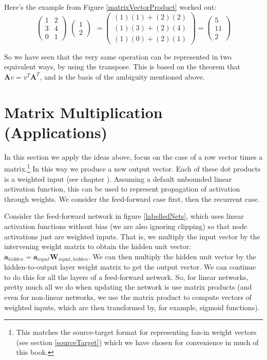 Here's the example from Figure \ref{matrixVectorProduct} worked out:
\[
  \begin{pmatrix}
    1 & 2 \\
    3 & 4 \\
    0 & 1
  \end{pmatrix}
    \begin{matrix}
    \begin{pmatrix}1\\2\end{pmatrix}
  \end{matrix}
  =
  \begin{pmatrix}
    (1)(1) + (2)(2) \\
    (1)(3) + (2)(4) \\
    (1)(0) + (2)(1)
  \end{pmatrix}
  =
  \begin{pmatrix}
    5 \\
    11 \\
    2
  \end{pmatrix}
\]
\vspace*{.1cm}


So we have seen that the very same operation can be represented in two equivalent ways, by using the transpose. This is based on the theorem that  $\mathbf{A}v =  v^T\mathbf{A}^T$, and is the basis of the ambiguity mentioned above. 

\section{Matrix Multiplication (Applications)}


In this section we apply the ideas above, focus on the case of a row vector times a matrix.\footnote{This matches the source-target format for representing fan-in weight vectors (see section \ref{sourceTarget}) which we have chosen for convenience in much of this book.} In this way we produce a new output vector. Each of these dot products is a weighted input (see chapter ). Assuming a default unbounded linear activation function, this can be used to represent propagation of activation through weights. We consider the feed-forward case first, then the recurrent case.

Consider the feed-forward network in figure \ref{labelledNets}, which uses linear activation functions without bias (we are also ignoring clipping) so that node activations just are weighted inputs. That is, we multiply the input vector by the intervening weight matrix to obtain the hidden unit vector:  $\textbf{a}_{hidden} = \textbf{a}_{input} \textbf{W}_{input,hidden}$. We can then multiply the hidden unit vector by the hidden-to-output layer weight matrix to get the output vector. We can continue to do this for all the layers of a feed-forward network. So, for linear networks, pretty much all we do when updating the network is use matrix products (and even for non-linear networks, we use the matrix product to compute vectors of weighted inputs, which are then transformed by, for example, sigmoid functions).

